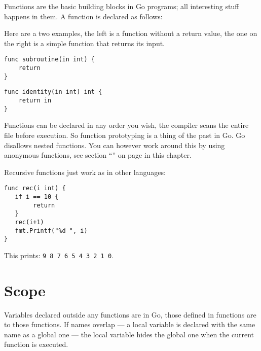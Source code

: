 
\noindent{}Functions are the basic building blocks in Go programs; all interesting
stuff happens in them. A function is declared as follows:

\showremarks
Here are a two examples, the left is a function without a return value,
the one on the right is a simple function that returns its input.

\begin{minipage}{.5\textwidth}
\begin{lstlisting}
func subroutine(in int) {
    return
}
\end{lstlisting}
\end{minipage}
\begin{minipage}{.5\textwidth}
\begin{lstlisting}
func identity(in int) int {
    return in
}
\end{lstlisting}
\end{minipage}

Functions can be declared in any order you wish, the compiler scans the
entire file before execution. So function prototyping is a thing of the
past in Go.
Go disallows nested functions.  You can however
work around this by using anonymous functions, see section
``'' on page \pageref{sec:functions as values} 
in this chapter.

Recursive functions just work as in other languages:
\begin{lstlisting}[caption=Recursive function]
func rec(i int) {
   if i == 10 {
        return
   }
   rec(i+1)
   fmt.Printf("%d ", i)
}
\end{lstlisting}
This prints: \texttt{9 8 7 6 5 4 3 2 1 0}.
\section{Scope}
Variables declared outside any functions are  in Go, those
defined in functions are  to those functions. If names overlap --- a
local variable is declared with the same name as a global one --- the
local variable hides the global one when the current function is
executed.

